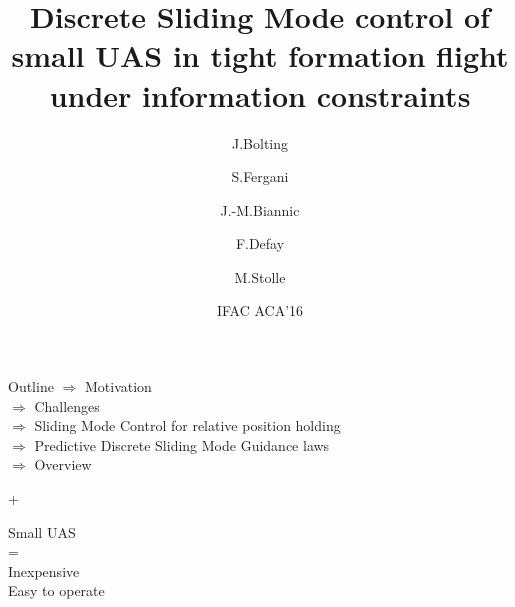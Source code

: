 \documentclass[12pt,svgnames,table,draft=false]{beamer}
\begin{document}
\usebackgroundtemplate{
}

\title{Discrete Sliding Mode control of small UAS in tight formation flight under information constraints}

\author{J.Bolting \and S.Fergani \and J.-M.Biannic \and F.Defay \and M.Stolle}
  
 
\date{IFAC ACA'16}

\maketitle

\usebackgroundtemplate{}

\begin{frame}{Outline}
  $\Rightarrow$ Motivation\\
  \vspace{1em}
  $\Rightarrow$ Challenges \\
  \vspace{1em}
  $\Rightarrow$ Sliding Mode Control for relative position holding\\
  \vspace{1em}  
  $\Rightarrow$ Predictive Discrete Sliding Mode Guidance laws \\
  \vspace{1em}  
  $\Rightarrow$ Overview \\
\end{frame}

\begin{frame}{+}
\vspace{7em}
\centering
	\begin{tcolorbox}[width=.8\textwidth,colback={gray!10!}]  
	\centering
	\Large
	Small UAS \\
	= \\
	Inexpensive \\
	Easy to operate
	\end{tcolorbox}  
	
\end{frame}
\end{document}
